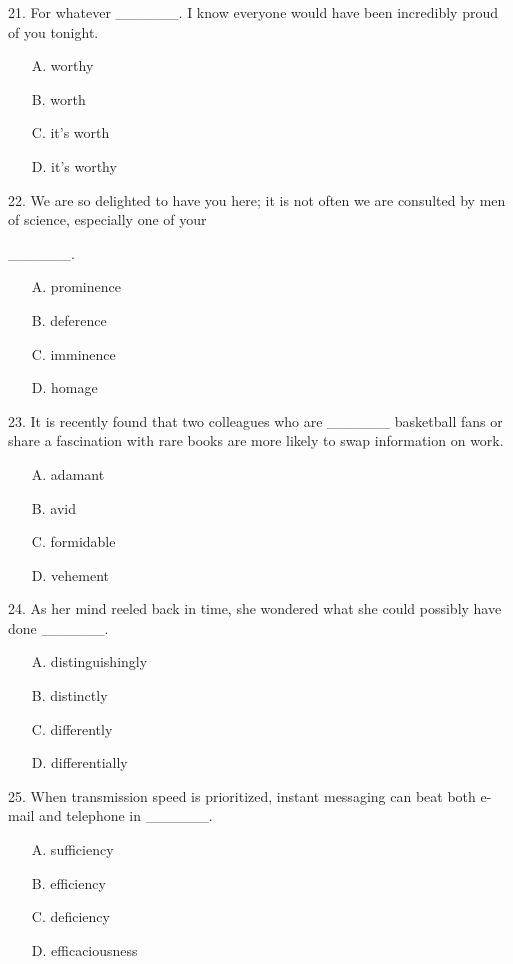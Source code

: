 \documentclass[UTF8,11pt]{ctexart}
\begin{document}
21. For whatever \_\_\_\_\_\_. I know everyone would have been incredibly proud of you tonight.


\begin{itemize}[leftmargin=2em,itemsep=.2em,topsep=.4em]\item[A.] worthy
\item[B.] worth
\item[C.] it’s worth
\item[D.] it’s worthy
\end{itemize}

22. We are so delighted to have you here; it is not often we are consulted by men of science, especially one of your


\_\_\_\_\_\_.


\begin{itemize}[leftmargin=2em,itemsep=.2em,topsep=.4em]\item[A.] prominence
\item[B.] deference
\item[C.] imminence
\item[D.] homage
\end{itemize}

23. It is recently found that two colleagues who are \_\_\_\_\_\_ basketball fans or share a fascination with rare books are more likely to swap information on work.


\begin{itemize}[leftmargin=2em,itemsep=.2em,topsep=.4em]\item[A.] adamant
\item[B.] avid
\item[C.] formidable
\item[D.] vehement
\end{itemize}

24. As her mind reeled back in time, she wondered what she could possibly have done \_\_\_\_\_\_.


\begin{itemize}[leftmargin=2em,itemsep=.2em,topsep=.4em]\item[A.] distinguishingly
\item[B.] distinctly
\item[C.] differently
\item[D.] differentially
\end{itemize}

25. When transmission speed is prioritized, instant messaging can beat both e-mail and telephone in \_\_\_\_\_\_.


\begin{itemize}[leftmargin=2em,itemsep=.2em,topsep=.4em]\item[A.] sufficiency
\item[B.] efficiency
\item[C.] deficiency
\item[D.] efficaciousness
\end{itemize}
\end{document}
